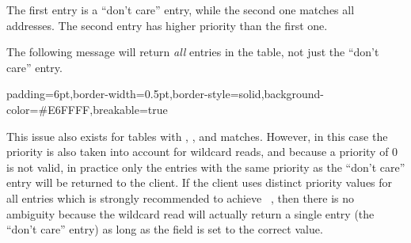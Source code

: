 \documentclass[11pt]{article}
\begin{document}
{%
\noindent{}The first entry is a \textquotedblleft{}don't care\textquotedblright{} entry, while the second one matches all
 addresses. The second entry has higher priority than the first one.%

The following  message will return \emph{all} entries in the table, not
just the \textquotedblleft{}don't care\textquotedblright{} entry.%

\begin{mdbmargintb}{6pt}{6pt}%
\begin{mdblock}{padding=6pt,border-width=0.5pt,border-style=solid,background-color=\#E6FFFF,breakable=true}%
\begin{mdpre}%
\end{mdpre}%
\end{mdblock}%
\end{mdbmargintb}%

\noindent{}This issue also exists for tables with , , and 
matches. However, in this case the priority is also taken into account for
wildcard reads, and because a priority of 0 is not valid, in practice only the
entries with the same priority as the \textquotedblleft{}don't care\textquotedblright{} entry will be returned to the
client. If the client uses distinct priority values for all entries \textemdash{} which is
strongly recommended to achieve~ \textemdash{},
then there is no ambiguity because the wildcard read will actually return a
single entry (the \textquotedblleft{}don't care\textquotedblright{} entry) as long as the  field is set to
the correct value.%

}
\end{document}
